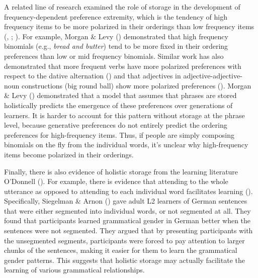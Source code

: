 \documentclass[
  12pt,
  letterpaper,
]{scrreprt}
\begin{document}
A related line of research examined the role of storage in the
development of frequency-dependent preference extremity, which is the
tendency of high frequency items to be more polarized in their orderings
than low frequency items
(,
;
). For example, Morgan \& Levy
()
demonstrated that high frequency binomials (e.g., \emph{bread and
butter}) tend to be more fixed in their ordering preferences than low or
mid frequency binomials. Similar work has also demonstrated that more
frequent verbs have more polarized preferences with respect to the
dative alternation
() and that adjectives in adjective-adjective-noun
constructions (big round ball) show more polarized preferences
(). Morgan \& Levy
()
demonstrated that a model that assumes that phrases are stored
holistically predicts the emergence of these preferences over
generations of learners. It is harder to account for this pattern
without storage at the phrase level, because generative preferences do
not entirely predict the ordering preferences for high-frequency items.
Thus, if people are simply composing binomials on the fly from the
individual words, it's unclear why high-frequency items become polarized
in their orderings.

Finally, there is also evidence of holistic storage from the learning
literature O'Donnell
(). For
example, there is evidence that attending to the whole utterance as
opposed to attending to each individual word facilitates learning
(). Specifically, Siegelman \& Arnon
() gave adult L2
learners of German sentences that were either segmented into individual
words, or not segmented at all. They found that participants learned
grammatical gender in German better when the sentences were not
segmented. They argued that by presenting participants with the
unsegmented segments, participants were forced to pay attention to
larger chunks of the sentences, making it easier for them to learn the
grammatical gender patterns. This suggests that holistic storage may
actually facilitate the learning of various grammatical relationships.
\end{document}
